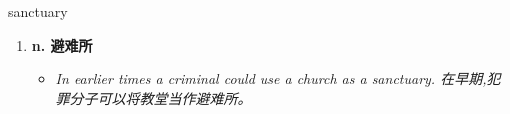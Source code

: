 
\begin{frame}
{\huge sanctuary}
\begin{center}
\begin{enumerate}\Large
  \item \textbf{n. 避难所}
  \begin{itemize}
    \item \em{\Large{In earlier times a criminal could use a church as a sanctuary. 在早期,犯罪分子可以将教堂当作避难所。}}
  \end{itemize}
\end{enumerate}
\end{center}
\end{frame}

